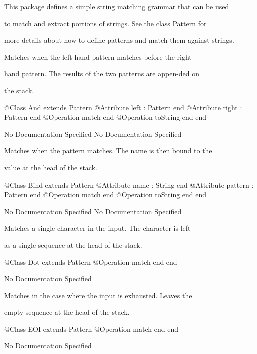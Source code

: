      This package defines a simple string matching grammar that can be used

     to match and extract portions of strings. See the class Pattern for

     more details about how to define patterns and match them against strings.

      Matches when the left hand pattern matches before the right

      hand pattern. The results of the two patterns are appen-ded on

      the stack.
\begin{Interface}
@Class And extends Pattern
  @Attribute left : Pattern end
  @Attribute right : Pattern end
  @Operation match end
  @Operation toString end
end
\end{Interface}
No Documentation Specified
No Documentation Specified

      Matches when the pattern matches. The name is then bound to the

      value at the head of the stack.
\begin{Interface}
@Class Bind extends Pattern
  @Attribute name : String end
  @Attribute pattern : Pattern end
  @Operation match end
  @Operation toString end
end
\end{Interface}
No Documentation Specified
No Documentation Specified

      Matches a single character in the input. The character is left

      as a single sequence at the head of the stack.
\begin{Interface}
@Class Dot extends Pattern
  @Operation match end
end
\end{Interface}
No Documentation Specified

      Matches in the case where the input is exhausted. Leaves the

      empty sequence at the head of the stack.
\begin{Interface}
@Class EOI extends Pattern
  @Operation match end
end
\end{Interface}
No Documentation Specified

